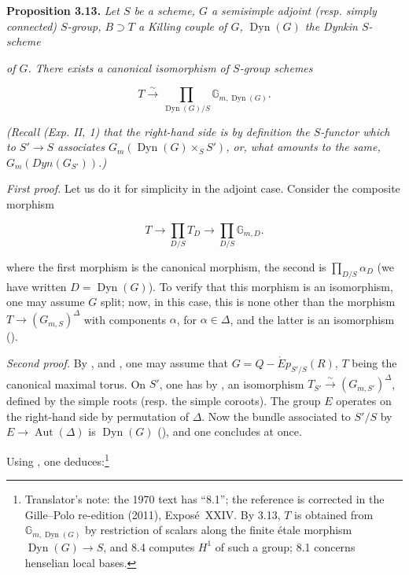 
\textbf{Proposition 3.13.} \emph{Let \(S\) be a scheme, \(G\) a semisimple adjoint (resp. simply connected) \(S\)-group, \(B \supset T\) a
Killing couple of \(G\), \(\operatorname{Dyn}(G)\) the Dynkin \(S\)-scheme}

\emph{of \(G\). There exists a canonical isomorphism of \(S\)-group schemes}

\[
  T\xrightarrow{\sim}
  \prod_{\operatorname{Dyn}(G)/S}
  \mathbb G_{m,\operatorname{Dyn}(G)}.
\]

\emph{(Recall (Exp. II, 1) that the right-hand side is by definition the \(S\)-functor which to \(S' \to S\) associates
\(G_{m}(\operatorname{Dyn}(G) \times_{S} S')\), or, what amounts to the same, \(G_{m}(Dyn(G_{S'}))\).)}

\emph{First proof.} Let us do it for simplicity in the adjoint case. Consider the composite morphism

\[
  T\longrightarrow\prod_{D/S}T_D
  \longrightarrow\prod_{D/S}\mathbb G_{m,D}.
\]

where the first morphism is the canonical morphism, the second is \(\prod_{D/S} \alpha_{D}\) (we have written \(D =
\operatorname{Dyn}(G)\)). To verify that this morphism is an isomorphism, one may assume \(G\) split; now, in this case, this is none
other than the morphism \(T \to (G_{m, S})^{\Delta}\) with components \(\alpha\), for \(\alpha \in \Delta\), and the latter is
an isomorphism ().

\emph{Second proof.} By ,  and , one may assume that \(G = Q-\acute{E}p_{S'/S}(R)\), \(T\) being the canonical maximal
torus. On \(S'\), one has by , an isomorphism \(T_{S'} \xrightarrow{\sim} (G_{m, S'})^{\Delta}\), defined by
the simple roots (resp. the simple coroots). The group \(E\) operates on the right-hand side by permutation of \(\Delta\).
Now the bundle associated to \(S'/S\) by \(E \to \operatorname{Aut}(\Delta)\) is \(\operatorname{Dyn}(G)\) (), and one concludes at once.

Using , one deduces:\footnote{Translator's note:
the 1970 text has ``8.1''; the reference is corrected in the Gille--Polo re-edition (2011),
Exposé~XXIV. By 3.13, \(T\) is obtained from \(\mathbb G_{m,\operatorname{Dyn}(G)}\) by restriction of
scalars along the finite étale morphism \(\operatorname{Dyn}(G)\to S\), and 8.4 computes \(H^1\) of
such a group; 8.1 concerns henselian local bases.}

